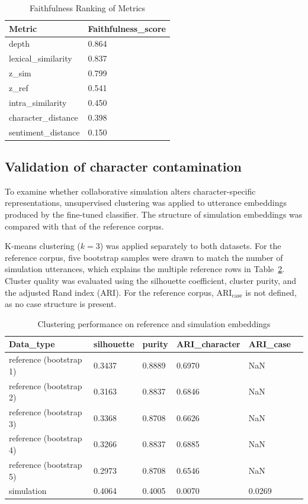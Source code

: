 \documentclass{article}
\begin{document}
\begin{table}[H]
\centering
\begin{tabular}{l l}\toprule
Metric& Faithfulness\_score\\\midrule
depth & 0.864 \\
lexical\_similarity & 0.837 \\
z\_sim & 0.799 \\
z\_ref & 0.541 \\
intra\_similarity & 0.450 \\
character\_distance & 0.398 \\
sentiment\_distance & 0.150 \\ \bottomrule
\end{tabular}
\caption{Faithfulness Ranking of Metrics}
\label{tab:ranking}
\end{table}


\subsection{Validation of character contamination} \label{sec:results_contamination}

To examine whether collaborative simulation alters character-specific representations, unsupervised clustering was applied to utterance embeddings produced by the fine-tuned classifier. The structure of simulation embeddings was compared with that of the reference corpus.

K-means clustering ($k=3$) was applied separately to both datasets. For the reference corpus, five bootstrap samples were drawn to match the number of simulation utterances, which explains the multiple reference rows in Table~\ref{tab:clustering}. Cluster quality was evaluated using the silhouette coefficient, cluster purity, and the adjusted Rand index (ARI). For the reference corpus, $\mathrm{ARI_{case}}$ is not defined, as no case structure is present.


\begin{table}[H]
\centering
\begin{tabular}{l l l l l l}\toprule
Data\_type& silhouette & purity & ARI\_character & ARI\_case \\\midrule
reference (bootstrap 1) & 0.3437 & 0.8889 & 0.6970 & NaN \\
reference (bootstrap 2) & 0.3163 & 0.8837 & 0.6846 & NaN \\
reference (bootstrap 3) & 0.3368 & 0.8708 & 0.6626 & NaN \\
reference (bootstrap 4) & 0.3266 & 0.8837 & 0.6885 & NaN \\
reference (bootstrap 5) & 0.2973 & 0.8708 & 0.6546 & NaN \\
simulation & 0.4064 & 0.4005 & 0.0070 & 0.0269 \\ \bottomrule
\end{tabular}
\caption{Clustering performance on reference and simulation embeddings}
\label{tab:clustering}
\end{table}
\end{document}
